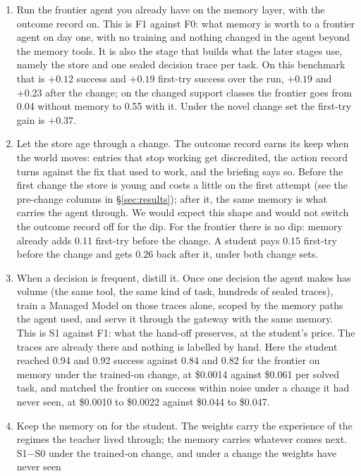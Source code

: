 \documentclass[11pt]{article}
\newcommand{\cond}[1]{\textsf{#1}}
\begin{document}
\begin{enumerate}[leftmargin=1.8em, itemsep=0.3em]
\item Run the frontier agent you already have on the memory layer, with the outcome record
  on. This is \cond{F1} against \cond{F0}: what memory is worth to a frontier agent on day
  one, with no training and nothing changed in the agent beyond the memory tools. It is also
  the stage that builds what the later stages use, namely the store and one sealed decision
  trace per task.
  On this benchmark that is $+0.12$ success and $+0.19$ first-try
success over the run, $+0.19$ and $+0.23$ after the change; on the changed support classes the
frontier goes from 0.04 without memory to 0.55 with it. Under the novel change set the first-try
gain is $+0.37$.
\item Let the store age through a change. The outcome record earns its keep when the world
  moves: entries that stop working get discredited, the action record turns against the fix
  that used to work, and the briefing says so. Before the first change the store is young and
  costs a little on the first attempt (see the pre-change columns in \S\ref{sec:results});
  after it, the same memory is what carries the agent through. We would expect this shape
  and would not switch the outcome record off for the dip.
  For the frontier there is no dip: memory already adds $0.11$ first-try
before the change. A student pays $0.15$ first-try before the change and gets $0.26$ back after
it, under both change sets.
\item When a decision is frequent, distill it. Once one decision the agent makes has volume
  (the same tool, the same kind of task, hundreds of sealed traces), train a Managed Model on
  those traces alone, scoped by the memory paths the agent used, and serve it through the
  gateway with the same memory. This is \cond{S1} against \cond{F1}: what the hand-off
  preserves, at the student's price. The traces are already there and nothing is labelled by
  hand.
  Here the student reached 0.94 and 0.92 success against 0.84 and 0.82
for the frontier on memory under the trained-on change, at \$0.0014 against \$0.061 per solved
task, and matched the frontier on success within noise under a change it had never seen, at
\$0.0010 to \$0.0022 against \$0.044 to \$0.047.
\item Keep the memory on for the student. The weights carry the experience of the regimes
  the teacher lived through; the memory carries whatever comes next. \cond{S1}$-$\cond{S0}
  under the trained-on change, and under a change the weights have never seen

\end{enumerate}
\end{document}
